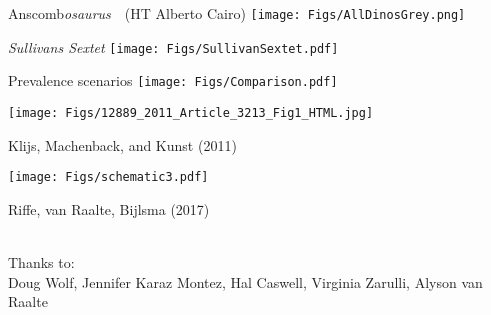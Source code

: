 \documentclass[20pt,usenames,dvipsnames]{beamer}
\begin{document}
\begin{frame}[plain]
\Huge
\begin{center}
Anscomb\emph{osaurus}~~\small (HT Alberto Cairo)
\texttt{[image: Figs/AllDinosGrey.png]}
\end{center}
\end{frame}


\begin{frame}[plain]
\Huge
\begin{center}
\emph{Sullivans Sextet} 
\texttt{[image: Figs/SullivanSextet.pdf]}
\end{center}
\end{frame}


\begin{frame}[plain]
\Huge
Prevalence scenarios
\texttt{[image: Figs/Comparison.pdf]}
\end{frame}

\begin{frame}[plain]
\small
\begin{center}
\texttt{[image: Figs/12889\_2011\_Article\_3213\_Fig1\_HTML.jpg]}
\end{center}

Klijs, Machenback, and Kunst (2011)
\end{frame}

\begin{frame}[plain]
\small
\begin{center}
\texttt{[image: Figs/schematic3.pdf]}
\end{center}
Riffe, van Raalte, Bijlsma (2017)\\~
\end{frame}

\begin{frame}[plain]
\huge
\begin{center}
Thanks to:\\
Doug Wolf, Jennifer Karaz Montez, Hal Caswell, Virginia Zarulli,
Alyson van Raalte
\end{center}
\end{frame}
\end{document}
